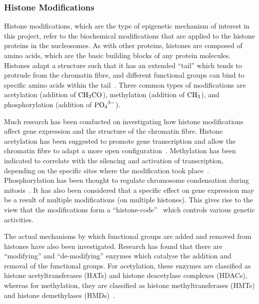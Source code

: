 \documentclass[12pt]{article}
\begin{document}
\subsubsection{Histone Modifications}
\label{sec:histone}
Histone modifications, which are the type of epigenetic mechanism of interest in this project, refer to the biochemical modifications that are applied to the histone proteins in the nucleosomes. As with other proteins, histones are composed of amino acids, which are the basic building blocks of any protein molecules. Histones adapt a structure such that it has an extended ``tail'' which tends to protrude from the chromatin fibre, and different functional groups can bind to specific amino acids within the tail~\cite{strahl2000}. Three common types of modifications are acetylation (addition of $\ce{CH3CO}$), methylation (addition of $\ce{CH3}$), and phosphorylation (addition of $\ce{PO4^{3-}}$). 

Much research has been conducted on investigating how histone modifications affect gene expression and the structure of the chromatin fibre. Histone acetylation has been suggested to promote gene transcription and allow the chromatin fibre to adapt a more open configuration~\cite{shahbazian2007}. Methylation has been indicated to correlate with the silencing and activation of transcription, depending on the specific sites where the modification took place~\cite{greer2012}. Phosphorylation has been thought to regulate chromosome condensation during mitosis~\cite{sawicka2014}. It has also been considered that a specific effect on gene expression may be a result of multiple modifications (on multiple histones). This gives rise to the view that the modifications form a ``histone-code''~\cite{strahl2000} which controls various genetic activities.

The actual mechanisms by which functional groups are added and removed from histones have also been investigated. Research has found that there are ``modifying'' and ``de-modifying'' enzymes which catalyse the addition and removal of the functional groups. For acetylation, these enzymes are classified as histone acetyltransferases (HATs) and histone deacetylase complexes (HDACs), whereas for methylation, they are classified as histone methyltransferases (HMTs) and histone demethylases (HMDs)~\cite{shahbazian2007, greer2012}.
\end{document}
